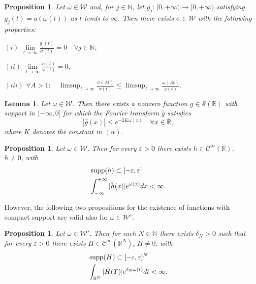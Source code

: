 \documentclass[twoside]{amsart}
\newtheorem{Lemma}[Th]{Lemma}
\newtheorem{Prop}[Th]{Proposition}
\begin{document}
\begin{Prop}
Let $\omega\in{\mathcal{W}}$ and, for $j\in\mathbb{N}$,
let $g_{j}:\, [0,+\infty)\to[0,+\infty)$ satisfying
    $g_{j}(t)=o(\omega(t))$ as $t$ tends
to $\infty$. Then there exists $\sigma\in{\mathcal{W}}$ with the
following properties:

$(i)$ ${\displaystyle {\displaystyle \underset{t\rightarrow\infty}{\lim}
    \frac{g_{j}(t)}{\sigma(t)}=0\,\,\,\,\,\,\forall j\in\mathbb{N},}}$

$(ii)$ ${\displaystyle \underset{t\rightarrow\infty}{\lim}{\displaystyle
    \frac{\sigma(t)}{\omega(t)}=0,}}$

$(iii)$ $\forall A>1:\quad
{\displaystyle \limsup_{t\to\infty}
  \frac{\sigma(At)}{\sigma(t)}\leq
  \limsup_{t\to\infty}
  \frac{\omega(At)}{\omega(t)}.}$
\end{Prop}

\begin{Lemma}
  Let $\omega\in{\mathcal{W}}$. Then there exists a nonzero function
  $g\in{\mathcal{S}}(\mathbb{R})$
with support in $(-\infty,0]$ for which the Fourier transform $\widehat{g}$
satisfies
\[
|\widehat{g}(x)|\leq  e^{ -2K\omega(x)}
\,\,\,\,\,\,\forall x\in\mathbb{R},
\]
where $K$ denotes the constant in $(\alpha)$.
\end{Lemma}

\begin{Prop}
  Let $\omega\in{\mathcal{W}}$. Then for every $\varepsilon>0$ there exists
  $h\in \mathcal C^{\infty}(\mathbb{R})$,
$h\not=0$, with
\begin{align*}
  & {\displaystyle \mbox{\ensuremath{\mathop{\rm supp}\nolimits}}(h)}
  \subset[-\varepsilon,\varepsilon]\\
 & {\displaystyle \int_{-\infty}^{+\infty}|\hat{h}(x)|e^{\omega(x)}dx}<\infty.
\end{align*}
\end{Prop}

However, the following two propositions for the existence of functions
with compact support are valid also for $\omega\in{\mathcal{W}}'$:

\begin{Prop}
Let $\omega\in{\mathcal{W}}'$. Then for each $N\in\mathbb{N}$ there exists
$\delta_{N}>0$ such that for every $\varepsilon>0$ there exists
$H\in\mathcal C^{\infty}(\mathbb{R}^{N})$, $H\not=0$, with
\begin{align*}
  & {\displaystyle \mbox{\ensuremath{\mathop{\rm supp}\nolimits}}(H)}
  \subset[-\varepsilon,\varepsilon]^{N}\\
  & {\displaystyle \int_{\mathbb{R}^{N}}
      |\hat{H}(T)|e^{\delta_{N}\omega(t)}dt}<\infty.
\end{align*}
\end{Prop}
\end{document}
